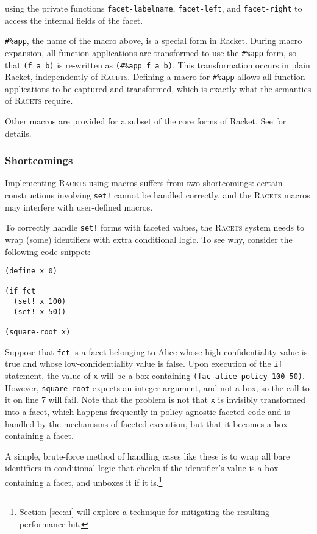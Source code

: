 \documentclass{article}
\begin{document}
\noindent using the private functions \texttt{facet-labelname}, \texttt{facet-left}, and \texttt{facet-right} to access the internal fields of the facet.

\texttt{\#\%app}, the name of the macro above, is a special form in Racket. During macro expansion, all function applications are transformed to use the \texttt{\#\%app} form, so that \texttt{(f a b)} is re-written as \texttt{(\#\%app f a b)}. This transformation occurs in plain Racket, independently of \textsc{Racets}. Defining a macro for \texttt{\#\%app} allows all function applications to be captured and transformed, which is exactly what the semantics of \textsc{Racets} require.

Other macros are provided for a subset of the core forms of Racket. See \cite{racets} for details.


\subsubsection{Shortcomings\label{sec:shortcomings}}
Implementing \textsc{Racets} using macros suffers from two shortcomings: certain constructions involving \texttt{set!} cannot be handled correctly, and the \textsc{Racets} macros may interfere with user-defined macros.

To correctly handle \texttt{set!} forms with faceted values, the \textsc{Racets} system needs to wrap (some) identifiers with extra conditional logic. To see why, consider the following code snippet:

\begin{lstlisting}
(define x 0)

(if fct
  (set! x 100)
  (set! x 50))

(square-root x)
\end{lstlisting}

Suppose that \texttt{fct} is a facet belonging to Alice whose high-confidentiality value is true and whose low-confidentiality value is false. Upon execution of the \texttt{if} statement, the value of \texttt{x} will be a box containing \texttt{(fac alice-policy 100 50)}. However, \texttt{square-root} expects an integer argument, and not a box, so the call to it on line 7 will fail. Note that the problem is not that \texttt{x} is invisibly transformed into a facet, which happens frequently in policy-agnostic faceted code and is handled by the mechanisms of faceted execution, but that it becomes a box containing a facet.

A simple, brute-force method of handling cases like these is to wrap all bare identifiers in conditional logic that checks if the identifier's value is a box containing a facet, and unboxes it if it is.\footnote{Section \ref{sec:ai} will explore a technique for mitigating the resulting performance hit.}
\end{document}
